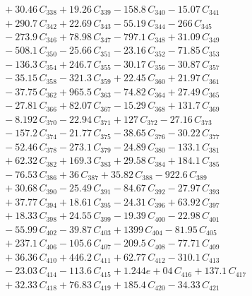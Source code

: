 \documentclass[a4paper,11pt]{article}
\begin{document}
\begin{align}
&\quad + 30.46\,C_{338} + 19.26\,C_{339} - 158.8\,C_{340} - 15.07\,C_{341} \nonumber\\
&\quad + 290.7\,C_{342} + 22.69\,C_{343} - 55.19\,C_{344} - 266\,C_{345} \nonumber\\
&\quad - 273.9\,C_{346} + 78.98\,C_{347} - 797.1\,C_{348} + 31.09\,C_{349} \nonumber\\
&\quad - 508.1\,C_{350} - 25.66\,C_{351} - 23.16\,C_{352} - 71.85\,C_{353} \nonumber\\
&\quad - 136.3\,C_{354} + 246.7\,C_{355} - 30.17\,C_{356} - 30.87\,C_{357} \nonumber\\
&\quad - 35.15\,C_{358} - 321.3\,C_{359} + 22.45\,C_{360} + 21.97\,C_{361} \nonumber\\
&\quad - 37.75\,C_{362} + 965.5\,C_{363} - 74.82\,C_{364} + 27.49\,C_{365} \nonumber\\
&\quad - 27.81\,C_{366} + 82.07\,C_{367} - 15.29\,C_{368} + 131.7\,C_{369} \nonumber\\
&\quad - 8.192\,C_{370} - 22.94\,C_{371} + 127\,C_{372} - 27.16\,C_{373} \nonumber\\
&\quad - 157.2\,C_{374} - 21.77\,C_{375} - 38.65\,C_{376} - 30.22\,C_{377} \nonumber\\
&\quad - 52.46\,C_{378} - 273.1\,C_{379} - 24.89\,C_{380} - 133.1\,C_{381} \nonumber\\
&\quad + 62.32\,C_{382} + 169.3\,C_{383} + 29.58\,C_{384} + 184.1\,C_{385} \nonumber\\
&\quad - 76.53\,C_{386} + 36\,C_{387} + 35.82\,C_{388} - 922.6\,C_{389} \nonumber\\
&\quad + 30.68\,C_{390} - 25.49\,C_{391} - 84.67\,C_{392} - 27.97\,C_{393} \nonumber\\
&\quad + 37.77\,C_{394} + 18.61\,C_{395} - 24.31\,C_{396} + 63.92\,C_{397} \nonumber\\
&\quad + 18.33\,C_{398} + 24.55\,C_{399} - 19.39\,C_{400} - 22.98\,C_{401} \nonumber\\
&\quad - 55.99\,C_{402} - 39.87\,C_{403} + 1399\,C_{404} - 81.95\,C_{405} \nonumber\\
&\quad + 237.1\,C_{406} - 105.6\,C_{407} - 209.5\,C_{408} - 77.71\,C_{409} \nonumber\\
&\quad + 36.36\,C_{410} + 446.2\,C_{411} + 62.77\,C_{412} - 310.1\,C_{413} \nonumber\\
&\quad - 23.03\,C_{414} - 113.6\,C_{415} + 1.244e+04\,C_{416} + 137.1\,C_{417} \nonumber\\
&\quad + 32.33\,C_{418} + 76.83\,C_{419} + 185.4\,C_{420} - 34.33\,C_{421} \nonumber\\

\end{align}
\end{document}
